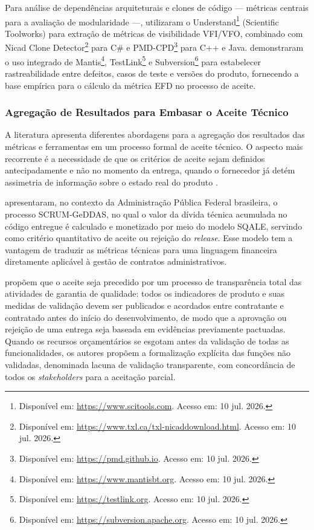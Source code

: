 Para análise de dependências arquiteturais e clones de código — métricas centrais para a avaliação de modularidade —,  utilizaram o Understand\footnote{Disponível em: \url{https://www.scitools.com}. Acesso em: 10 jul. 2026.} (Scientific Toolworks) para extração de métricas de visibilidade VFI/VFO, combinado com Nicad Clone Detector\footnote{Disponível em: \url{https://www.txl.ca/txl-nicaddownload.html}. Acesso em: 10 jul. 2026.} para C\# e PMD-CPD\footnote{Disponível em: \url{https://pmd.github.io}. Acesso em: 10 jul. 2026.} para C++ e Java.  demonstraram o uso integrado de Mantis\footnote{Disponível em: \url{https://www.mantisbt.org}. Acesso em: 10 jul. 2026.}, TestLink\footnote{Disponível em: \url{https://testlink.org}. Acesso em: 10 jul. 2026.} e Subversion\footnote{Disponível em: \url{https://subversion.apache.org}. Acesso em: 10 jul. 2026.} para estabelecer rastreabilidade entre defeitos, casos de teste e versões do produto, fornecendo a base empírica para o cálculo da métrica EFD no processo de aceite.

\subsubsection{Agregação de Resultados para Embasar o Aceite Técnico}

A literatura apresenta diferentes abordagens para a agregação dos resultados das métricas e ferramentas em um processo formal de aceite técnico. O aspecto mais recorrente é a necessidade de que os critérios de aceite sejam definidos antecipadamente e não no momento da entrega, quando o fornecedor já detém assimetria de informação sobre o estado real do produto \cite{tools2020monitoring}.

 apresentaram, no contexto da Administração Pública Federal brasileira, o processo SCRUM-GeDDAS, no qual o valor da dívida técnica acumulada no código entregue é calculado e monetizado por meio do modelo SQALE, servindo como critério quantitativo de aceite ou rejeição do \textit{release}. Esse modelo tem a vantagem de traduzir as métricas técnicas para uma linguagem financeira diretamente aplicável à gestão de contratos administrativos.

 propõem que o aceite seja precedido por um processo de transparência total das atividades de garantia de qualidade: todos os indicadores de produto e suas medidas de validação devem ser publicados e acordados entre contratante e contratado antes do início do desenvolvimento, de modo que a aprovação ou rejeição de uma entrega seja baseada em evidências previamente pactuadas. Quando os recursos orçamentários se esgotam antes da validação de todas as funcionalidades, os autores propõem a formalização explícita das funções não validadas, denominada lacuna de validação transparente, com concordância de todos os \textit{stakeholders} para a aceitação parcial.

